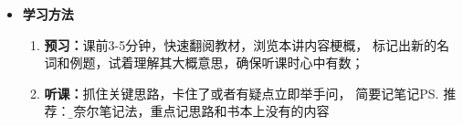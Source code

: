 \begin{itemize}
\begin{enumerate}
  		\begin{itemize}
  		  \item {朱健民，高等数学（一-五），中国大学MOOC}，
  		  \url{http://www.icourse163.org/course/NUDT-9004}
  		  \ps{简称：\b MOOC}\ldots
  		  \item underline{李建平\,等，高等数学典型例题与解法（一、二），中国大学MOOC}
  		  \url{http://www.icourse163.org/course/NUDT-1001979006}
  		  \ldots{}
  		  \item 闫浩，高等数学习题课，学堂在线
  		  \url{https://xuetangx.com/courses/course-v1:BUPT+3412113011+2017_T2/about}
   		  \item 李建平\,等，微积分CAP，中国大学MOOC
  		  \url{http://www.icourse163.org/course/NUDT-1001626005}
		\end{itemize} 
		\item {\bf 扩展阅读}
		\begin{itemize}
		  \item 基斯.德夫林，数学思维导论，人民邮电出版社，2016，北京
		  \item G.波利亚，怎样解题：数学思维的新方法，上海科技教育出版社，2011，上海
		  \item 李学数，数学与数学家的故事（1-5），上海科学技术出版社，2015，上海
		  \item 塞德里克·维拉尼\,等，一个定理的诞生：我与菲尔茨奖的一千个日夜，人民邮电出版社，2016，北京
		  \item 春日真人，庞家莱猜想：追寻宇宙的形状，人民邮电出版社，2015，北京
		  \item 蒂莫西.高尔斯，数学，译林出版社，2014，南京
		  \item 吴军，数学之美，人民邮电出版社，2016，北京
		  \item 李建平，漫谈数学与军事，中国大学MOOC
		\end{itemize}
	\end{enumerate}
	\item {\bf 学习方法}
	\begin{enumerate}
	  \item {\bf 预习：}课前3-5分钟，快速翻阅教材，浏览本讲内容梗概，
	  标记出新的名词和例题，试着理解其大概意思，确保听课时心中有数；
	  \item {\bf 听课：}抓住关键思路，卡住了或者有疑点立即举手问，
	  简要记笔记\ps{推荐：\b 康奈尔笔记法}，重点记思路和书本上没有的内容

\end{enumerate}
\end{itemize}

